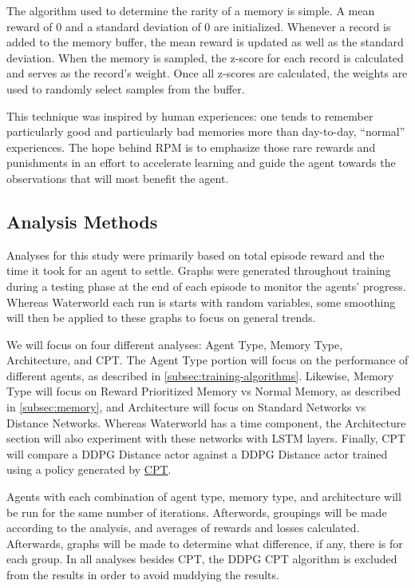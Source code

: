 The algorithm used to determine the rarity of a memory is simple.
A mean reward of 0 and a standard deviation of 0 are initialized.
Whenever a record is added to the memory buffer, the mean reward is updated as well as
the standard deviation.
When the memory is sampled, the z-score for each record is calculated and serves as
the record's weight.
Once all z-scores are calculated, the weights are used to randomly select samples
from the buffer.

This technique was inspired by human experiences: one tends to remember particularly
good and particularly bad memories more than day-to-day, ``normal'' experiences.
The hope behind RPM is to emphasize those rare rewards and punishments in an effort
to accelerate learning and guide the agent towards the observations that will most
benefit the agent.

\subsection{Analysis Methods}\label{subsec:analysis-methods}
Analyses for this study were primarily based on total episode reward and the time it
took for an agent to settle.
Graphs were generated throughout training during a testing phase at the end of each
episode to monitor the agents' progress.
Whereas Waterworld each run is starts with random variables, some smoothing will then
be applied to these graphs to focus on general trends.

We will focus on four different analyses: Agent Type, Memory Type, Architecture, and
CPT\@.
The Agent Type portion will focus on the performance of different agents, as 
described in \autoref{subsec:training-algorithms}.
Likewise, Memory Type will focus on Reward Prioritized Memory vs Normal Memory, as 
described in \autoref{subsec:memory}, and Architecture will focus on Standard Networks
vs Distance Networks.
Whereas Waterworld has a time component, the Architecture section will also 
experiment with these networks with LSTM layers.
Finally, CPT will compare a DDPG Distance actor against a DDPG Distance actor trained
using a policy generated by \hyperref[subsubsec:cpt]{CPT}.

Agents with each combination of agent type, memory type, and architecture will be run
for the same number of iterations.
Afterwords, groupings will be made according to the analysis, and averages of rewards
and losses calculated.
Afterwards, graphs will be made to determine what difference, if any, there is for
each group.
In all analyses besides CPT, the DDPG CPT algorithm is excluded from the results in
order to avoid muddying the results.

